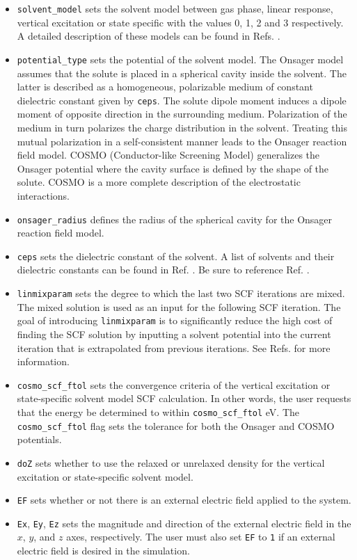 \begin{itemize}
\item \verb+solvent_model+ sets the solvent model between gas phase, linear response, vertical excitation or state specific with the values 0, 1, 2 and 3 respectively.  A detailed description of these models can be found in Refs. \cite{bjorgaard2015solvent1,bjorgaard2015solvent2}.
\item \verb+potential_type+ sets the potential of the solvent model.  The Onsager model assumes that the solute is placed in a spherical cavity inside the solvent. The latter is described as a homogeneous, polarizable medium of constant dielectric constant given by \verb+ceps+. The solute dipole moment induces a dipole moment of opposite direction in the surrounding medium. Polarization of the medium in turn polarizes the charge distribution in the solvent. Treating this mutual polarization in a self-consistent manner leads to the Onsager reaction field model. COSMO (Conductor-like Screening Model) generalizes the Onsager potential where the cavity surface is defined by the shape of the solute.  COSMO is a more complete description of the electrostatic interactions.
\item \verb+onsager_radius+ defines the radius of the spherical cavity for the Onsager reaction field model.  
\item \verb+ceps+ sets the dielectric constant of the solvent.  A list of solvents and their dielectric constants can be found in Ref. \cite{haynes2014crc}.  Be sure to reference Ref. \cite{haynes2014crc}.
\item \verb+linmixparam+ sets the degree to which the last two SCF iterations are mixed.  The mixed solution is used as an input for the following SCF iteration.  The goal of introducing \verb+linmixparam+ is to significantly reduce the high cost of finding the SCF solution by inputting a solvent potential into the current iteration that is extrapolated from previous iterations.  See Refs. \cite{bjorgaard2015solvent1,bjorgaard2015solvent2} for more information.
\item \verb+cosmo_scf_ftol+ sets the convergence criteria of the vertical excitation or state-specific solvent model SCF calculation.  In other words, the user requests that the energy be determined to within \verb+cosmo_scf_ftol+ eV.  The \verb+cosmo_scf_ftol+ flag sets the tolerance for both the Onsager and COSMO potentials.
\item \verb+doZ+ sets whether to use the relaxed or unrelaxed density for the vertical excitation or state-specific solvent model.
\item \verb+EF+ sets whether or not there is an external electric field applied to the system.
\item \verb+Ex+, \verb+Ey+, \verb+Ez+ sets the magnitude and direction of the external electric field in the $x$, $y$, and $z$ axes, respectively.  The user must also set \verb+EF+ to \verb+1+ if an external electric field is desired in the simulation.
\end{itemize}

